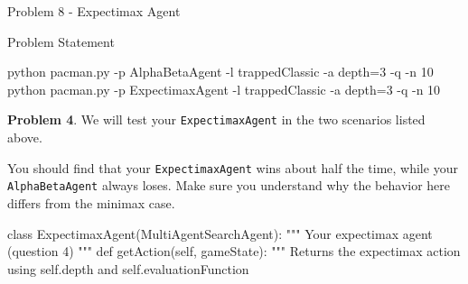 \begin{problem}{Problem 8 - Expectimax Agent}
\begin{statement}{Problem Statement}
    \begin{code}[Bash]
    python pacman.py -p AlphaBetaAgent -l trappedClassic -a depth=3 -q -n 10
    python pacman.py -p ExpectimaxAgent -l trappedClassic -a depth=3 -q -n 10
    \end{code}

        \begin{center}
            \begin{highlightenv}[15cm]
                \textbf{Problem 4}. We will test your \texttt{ExpectimaxAgent} in the two scenarios listed above.
            \end{highlightenv}
        \end{center}

        You should find that your \texttt{ExpectimaxAgent} wins about half the time, while your \texttt{AlphaBetaAgent} always loses. Make sure you understand why the behavior here differs from the minimax case.
    \end{statement}

    \begin{highlight}[Solution]
    \begin{code}[Python]
    class ExpectimaxAgent(MultiAgentSearchAgent):
    """
        Your expectimax agent (question 4)
    """
    def getAction(self, gameState):
        """
            Returns the expectimax action using self.depth and self.evaluationFunction


\end{code}
\end{highlight}
\end{problem}
